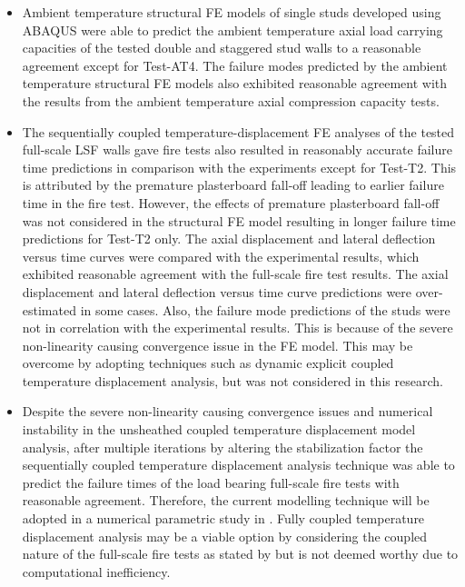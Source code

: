 \begin{itemize}
	\item Ambient temperature structural FE models of single studs developed using ABAQUS were able to predict the ambient temperature axial load carrying capacities of the tested double and staggered stud walls to a reasonable agreement except for Test-AT4. The failure modes predicted by the ambient temperature structural FE models also exhibited reasonable agreement with the results from the ambient temperature axial compression capacity tests.     
	\item The sequentially coupled temperature-displacement FE analyses of the tested full-scale LSF walls gave fire tests also resulted in reasonably accurate failure time predictions in comparison with the experiments except for Test-T2. This is attributed by the premature plasterboard fall-off leading to earlier failure time in the fire test. However, the effects of premature plasterboard fall-off was not considered in the structural FE model resulting in longer failure time predictions for Test-T2 only. The axial displacement and lateral deflection versus time curves were compared with the experimental results, which exhibited reasonable agreement with the full-scale fire test results. The axial displacement and lateral deflection versus time curve predictions were over-estimated in some cases. Also, the failure mode predictions of the studs were not in correlation with the experimental results. This is because of the severe non-linearity causing convergence issue in the FE model. This may be overcome by adopting techniques such as dynamic explicit coupled temperature displacement analysis, but was not considered in this research.  
	\item Despite the severe non-linearity causing convergence issues and numerical instability in the unsheathed coupled temperature displacement model analysis, after multiple iterations by altering the stabilization factor the sequentially coupled temperature displacement analysis technique was able to predict the failure times of the load bearing full-scale fire tests with reasonable agreement. Therefore, the current modelling technique will be adopted in a numerical parametric study in . Fully coupled temperature displacement analysis may be a viable option by considering the coupled nature of the full-scale fire tests as stated by \citet{Rusthi2018,Dias2019d} but is not deemed worthy due to computational inefficiency. 
\end{itemize}